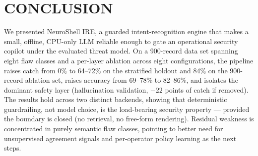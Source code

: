 \documentclass[conference]{IEEEtran}
\begin{document}
\section{CONCLUSION}
We presented NeuroShell IRE, a guarded intent-recognition engine that makes a small, offline, CPU-only LLM reliable enough to gate an operational security copilot under the evaluated threat model. On a 900-record data set spanning eight flaw classes and a per-layer ablation across eight configurations, the pipeline raises catch from $0\%$ to 64--72\% on the stratified holdout and 84\% on the 900-record ablation set, raises accuracy from 69--78\% to 82--86\%, and isolates the dominant safety layer (hallucination validation, ${-}22$ points of catch if removed). The results hold across two distinct backends, showing that deterministic guardrailing, not model choice, is the load-bearing security property --- provided the boundary is closed (no retrieval, no free-form rendering). Residual weakness is concentrated in purely semantic flaw classes, pointing to better need for unsupervised agreement signals and per-operator policy learning as the next steps.
\end{document}
